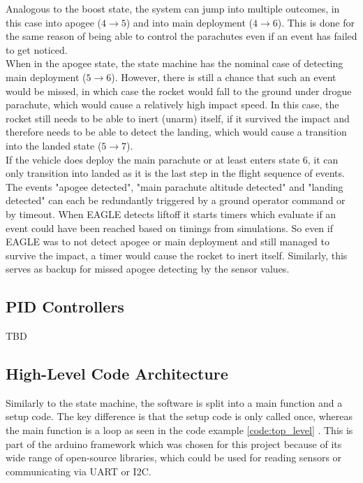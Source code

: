 \documentclass[fontsize=11pt,%
twoside,%
BCOR          = 8mm, %
DIV           = 11,  %
titlepage     = off,%
index=totoc,%
xcolor        = pdftex,%
dvipsnames,%
bibliography  = totoc,%
bibliography = numbered, %
listof        = notnumbered]{scrreprt}
\begin{document}
Analogous to the boost state, the system can jump into multiple outcomes, in this case into apogee ($4\rightarrow5$) and into main deployment ($4\rightarrow6$). This is done for the same reason of being able to control the parachutes even if an event has failed to get noticed.\\
When in the apogee state, the state machine has the nominal case of detecting main deployment ($5\rightarrow6$). However, there is still a chance that such an event would be missed, in which case the rocket would fall to the ground under drogue parachute, which would cause a relatively high impact speed. In this case, the rocket still needs to be able to inert (unarm) itself, if it survived the impact and therefore needs to be able to detect the landing, which would cause a transition into the landed state ($5\rightarrow7$).\\
If the vehicle does deploy the main parachute or at least enters state 6, it can only transition into landed as it is the last step in the flight sequence of events.\\
The events "apogee detected", "main parachute altitude detected" and "landing detected" can each be redundantly triggered by a ground operator command or by timeout. When EAGLE detects liftoff it starts timers which evaluate if an event could have been reached based on timings from simulations. So even if EAGLE was to not detect apogee or main deployment and still managed to survive the impact, a timer would cause the rocket to inert itself. Similarly, this serves as backup for missed apogee detecting by the sensor values.\\

\subsection{PID Controllers}
TBD

\subsection{High-Level Code Architecture}
Similarly to the state machine, the software is split into a main function and a setup code. The key difference is that the setup code is only called once, whereas the main function is a loop as seen in the code example \ref{code:top_level} . This is part of the arduino framework which was chosen for this project because of its wide range of open-source libraries, which could be used for reading sensors or communicating via UART or I2C.\\
\end{document}
